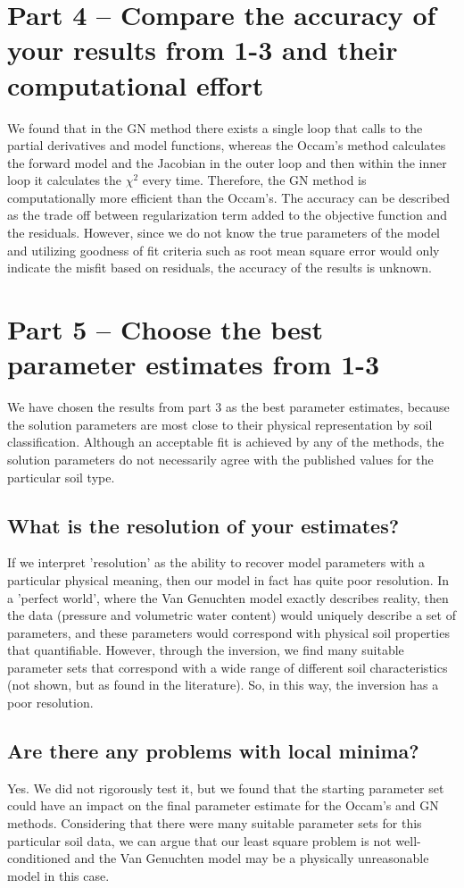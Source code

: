 \documentclass{article}
\begin{document}
\section*{Part 4 -- Compare the accuracy of your results from 1-3 and their computational effort}

We found that in the GN method there exists a single loop that calls to the partial derivatives and model functions, whereas the Occam's method calculates the forward model and the Jacobian in the outer loop and then within the inner loop it calculates the $\chi^2$ every time. Therefore, the GN method is computationally more efficient than the Occam's.
The accuracy can be described as the trade off between regularization term added to the objective function and the residuals. However, since we do not know the true parameters of the model and utilizing goodness of fit criteria such as root mean square error would only indicate the misfit based on residuals, the accuracy of the results is unknown.


\section*{Part 5 -- Choose the best parameter estimates from 1-3}
We have chosen the results from part 3 as the best parameter estimates, because the solution parameters are most close to their physical representation by soil classification. Although an acceptable fit is achieved by any of the methods, the solution parameters do not necessarily agree with the published values for the particular soil type.
\subsection*{\textbf{What is the resolution of your estimates?}}
If we interpret 'resolution' as the ability to recover model parameters with a particular physical meaning, then our model in fact has quite poor resolution. In a 'perfect world', where the Van Genuchten model exactly describes reality, then the data (pressure and volumetric water content) would uniquely describe a set of parameters, and these parameters would correspond with physical soil properties that quantifiable. However, through the inversion, we find many suitable parameter sets that correspond with a wide range of different soil characteristics (not shown, but as found in the literature). So, in this way, the inversion has a poor resolution. 
\subsection*{\textbf{Are there any problems with local minima?}}
Yes. We did not rigorously test it, but we found that the starting parameter set could have an impact on the final parameter estimate for the Occam's and GN methods. Considering that there were many suitable parameter sets for this particular soil data, we can argue that our least square problem is not well-conditioned and the Van Genuchten model may be a physically unreasonable model in this case.
\end{document}

